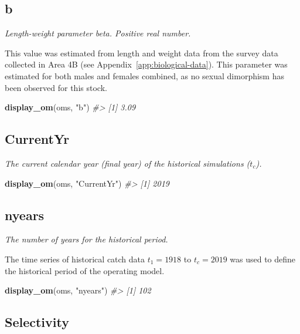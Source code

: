\documentclass[11pt]{book}
\newenvironment{Shaded}{\begin{snugshade}}{\end{snugshade}}
\newcommand{\CommentTok}[1]{\textcolor[rgb]{0.56,0.35,0.01}{\textit{#1}}}
\newcommand{\KeywordTok}[1]{\textcolor[rgb]{0.13,0.29,0.53}{\textbf{#1}}}
\newcommand{\NormalTok}[1]{#1}
\newcommand{\StringTok}[1]{\textcolor[rgb]{0.31,0.60,0.02}{#1}}
\begin{document}
\subsection{b}

\emph{Length-weight parameter beta. Positive real number.}

This value was estimated from length and weight data from the survey data collected in Area 4B (see Appendix~\ref{app:biological-data}). This parameter was estimated for both males and females combined, as no sexual dimorphism has been observed for this stock.
\begin{Shaded}
\begin{Highlighting}[]
\KeywordTok{display_om}\NormalTok{(oms, }\StringTok{"b"}\NormalTok{)}
\CommentTok{#> [1] 3.09}
\end{Highlighting}
\end{Shaded}
\label{app:desc-fleet-yelloweye}

\label{app:desc-fleet-currentyr-yelloweye}
\subsection{CurrentYr}

\emph{The current calendar year (final year) of the historical simulations (\(t_c\)).}
\begin{Shaded}
\begin{Highlighting}[]
\KeywordTok{display_om}\NormalTok{(oms, }\StringTok{"CurrentYr"}\NormalTok{)}
\CommentTok{#> [1] 2019}
\end{Highlighting}
\end{Shaded}
\label{app:desc-fleet-nyears-yelloweye}
\subsection{nyears}

\emph{The number of years for the historical period.}

The time series of historical catch data \(t_1 = 1918\) to \(t_c = 2019\) was used to define the historical period of the operating model.
\begin{Shaded}
\begin{Highlighting}[]
\KeywordTok{display_om}\NormalTok{(oms, }\StringTok{"nyears"}\NormalTok{)}
\CommentTok{#> [1] 102}
\end{Highlighting}
\end{Shaded}
\label{app:desc-fleet-selectivity-yelloweye}
\subsection{Selectivity}
\end{document}
